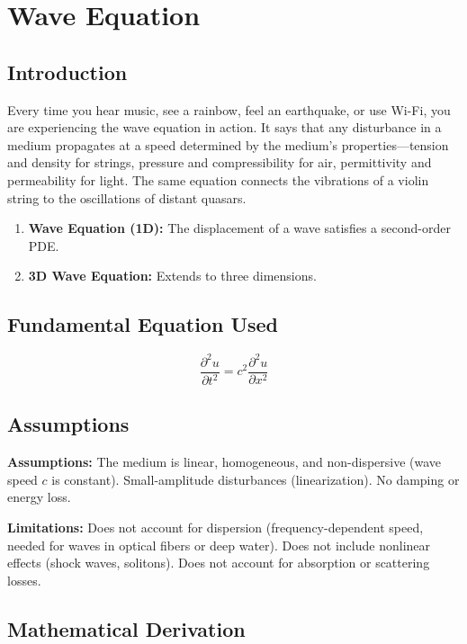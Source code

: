 \chapter{Wave Equation}

\section*{Introduction}

Every time you hear music, see a rainbow, feel an earthquake, or use Wi-Fi, you are experiencing the wave equation in action. It says that any disturbance in a medium propagates at a speed determined by the medium's properties---tension and density for strings, pressure and compressibility for air, permittivity and permeability for light. The same equation connects the vibrations of a violin string to the oscillations of distant quasars.

\begin{enumerate}
\item \textbf{Wave Equation (1D):} The displacement of a wave satisfies a second-order PDE.

\item \textbf{3D Wave Equation:} Extends to three dimensions.

\end{enumerate}
\section*{Fundamental Equation Used}

\[
\frac{\partial^2 u}{\partial t^2} = c^2 \frac{\partial^2 u}{\partial x^2}
\]


\section*{Assumptions}

\textbf{Assumptions:} The medium is linear, homogeneous, and non-dispersive (wave speed $c$ is constant). Small-amplitude disturbances (linearization). No damping or energy loss.


\textbf{Limitations:} Does not account for dispersion (frequency-dependent speed, needed for waves in optical fibers or deep water). Does not include nonlinear effects (shock waves, solitons). Does not account for absorption or scattering losses.


\section*{Mathematical Derivation}

